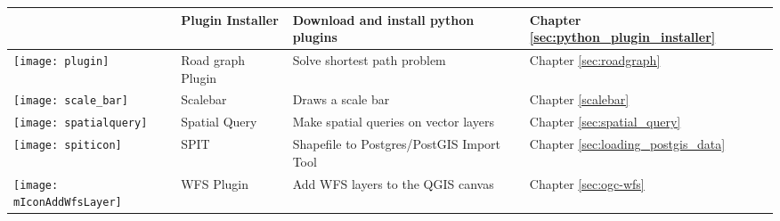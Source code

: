 {\begin{longtable}{|p{1.2cm}|p{3.8cm}|p{7.5cm}|p{3cm}|}
 & Plugin Installer \index{plugins!Plugin Installer} & Download and install python plugins & Chapter \ref{sec:python_plugin_installer}\\
\hline
\texttt{[image: plugin]}
 & Road graph Plugin \index{plugins!road graph} & Solve shortest path problem & Chapter \ref{sec:roadgraph} \\
\hline
\texttt{[image: scale\_bar]}
 & Scalebar \index{plugins!scalebar}& Draws a scale bar & Chapter \ref{scalebar} \\
\hline
\texttt{[image: spatialquery]}
 & Spatial Query & Make spatial queries on vector layers & Chapter \ref{sec:spatial_query} \\
\hline
\texttt{[image: spiticon]}
 & SPIT \index{plugins!spit} & Shapefile to Postgres/PostGIS Import Tool & Chapter \ref{sec:loading_postgis_data} \\
 \hline
\texttt{[image: mIconAddWfsLayer]}
 & WFS Plugin & Add WFS layers to the QGIS canvas & Chapter \ref{sec:ogc-wfs} \\
\hline
\end{longtable}}

\newpage

